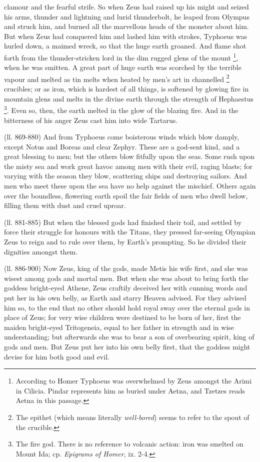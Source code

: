 clamour and the fearful strife. So when Zeus had raised up his might and seized
his arms, thunder and lightning and lurid thunderbolt, he leaped from Olympus
and struck him, and burned all the marvellous heads of the monster about him.
But when Zeus had conquered him and lashed him with strokes, Typhoeus was
hurled down, a maimed wreck, so that the huge earth groaned. And flame shot
forth from the thunder-stricken lord in the dim rugged glens of the mount \footnote{According to Homer
Typhoeus was overwhelmed by Zeus amongst the Arimi in Cilicia. Pindar
represents him as buried under Aetna, and Tzetzes reads Aetna in this passage.}, when he was smitten. A great
part of huge earth was scorched by the terrible vapour and melted as tin melts
when heated by men’s art in channelled \footnote{The epithet (which means
literally \emph{well-bored}) seems to refer to the spout of the
crucible.}
crucibles; or as iron, which is hardest of all things, is softened by glowing
fire in mountain glens and melts in the divine earth through the strength of
Hephaestus \footnote{The fire god. There is no
reference to volcanic action: iron was smelted on Mount Ida; cp.
\emph{Epigrams of Homer}, ix. 2-4.}. Even so, then, the earth melted
in the glow of the blazing fire. And in the bitterness of his anger Zeus cast
him into wide Tartarus.

(ll. 869-880) And from Typhoeus come boisterous winds which blow damply, except
Notus and Boreas and clear Zephyr. These are a god-sent kind, and a great
blessing to men; but the others blow fitfully upon the seas. Some rush upon the
misty sea and work great havoc among men with their evil, raging blasts; for
varying with the season they blow, scattering ships and destroying sailors. And
men who meet these upon the sea have no help against the mischief. Others again
over the boundless, flowering earth spoil the fair fields of men who dwell
below, filling them with dust and cruel uproar.

(ll. 881-885) But when the blessed gods had finished their toil, and settled by
force their struggle for honours with the Titans, they pressed far-seeing
Olympian Zeus to reign and to rule over them, by Earth’s prompting. So he
divided their dignities amongst them.

(ll. 886-900) Now Zeus, king of the gods, made Metis his wife first, and she
was wisest among gods and mortal men. But when she was about to bring forth the
goddess bright-eyed Athene, Zeus craftily deceived her with cunning words and
put her in his own belly, as Earth and starry Heaven advised. For they advised
him so, to the end that no other should hold royal sway over the eternal gods
in place of Zeus; for very wise children were destined to be born of her, first
the maiden bright-eyed Tritogeneia, equal to her father in strength and in wise
understanding; but afterwards she was to bear a son of overbearing spirit, king
of gods and men. But Zeus put her into his own belly first, that the goddess
might devise for him both good and evil.

